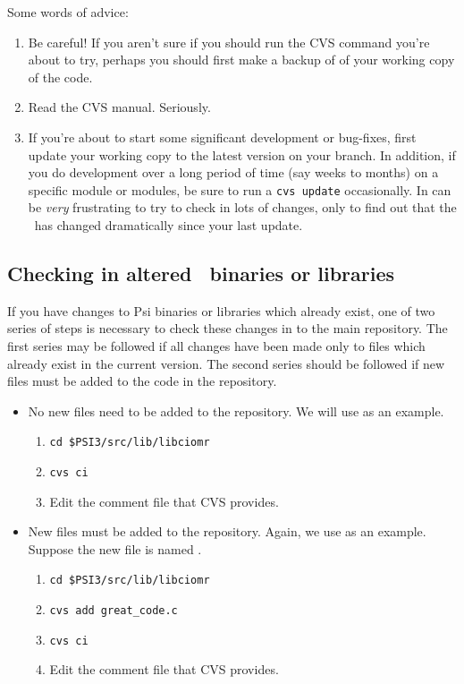 \noindent
Some words of advice:
\begin{enumerate}
\item Be careful!  If you aren't sure if you should run the CVS command
you're about to try, perhaps you should first make a backup of of your
working copy of the code.
\item Read the CVS manual.  Seriously.
\begin{center}
\end{center}
\item If you're about to start some significant development or bug-fixes,
first update your working copy to the latest version on your branch.
In addition, if you do development over a long period of time (say weeks to
months) on a specific module or modules, be sure to run a {\tt cvs update}
occasionally. In can be {\em very} frustrating to try to check in lots
of changes, only to find out that the \PSIthree\ has changed dramatically
since your last update.
\end{enumerate}

\subsection{Checking in altered \PSIthree\ binaries or libraries}

If you have changes to Psi binaries or libraries which already exist, one
of two series of steps is necessary to check these changes in to the main
repository. The first series may be followed if all changes have been made
only to files which already exist in the current version. The second series
should be followed if new files must be added to the code in the repository.

\begin{itemize}
\item No new files need to be added to the repository. We will use
 as an example. 
\begin{enumerate}
\item {\tt cd \$PSI3/src/lib/libciomr}
\item {\tt cvs ci}
\item Edit the comment file that CVS provides. 
\end{enumerate}
\item New files must be added to the repository. Again, we use 
as an example. Suppose the new file is named  .
\begin{enumerate}
\item {\tt cd \$PSI3/src/lib/libciomr} 
\item {\tt cvs add great\_code.c} 
\item {\tt cvs ci}
\item Edit the comment file that CVS provides.
\end{enumerate}
\end{itemize}


